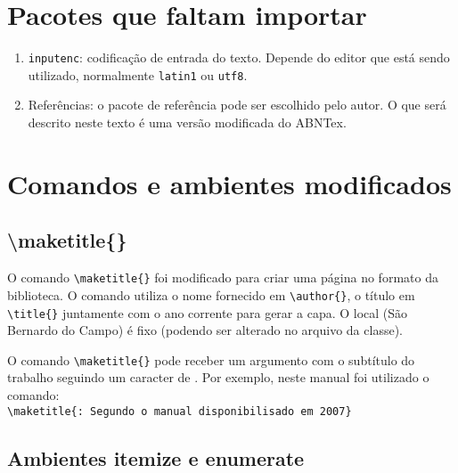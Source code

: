 \section{Pacotes que faltam importar}

    \begin{enumerate}
        \item\verb+inputenc+: codificação de entrada do texto. Depende do editor que está sendo utilizado, normalmente \texttt{latin1} ou \texttt{utf8}.
        \item Referências: o pacote de referência pode ser escolhido pelo autor. O que será descrito neste texto é uma versão modificada do ABNTex.
    \end{enumerate}

\section{Comandos e ambientes modificados}
    
    \subsection{\textbackslash maketitle\{\}}
    
    O comando \verb+\maketitle{}+ foi modificado para criar uma página no formato da biblioteca. O comando utiliza o nome fornecido em \verb+\author{}+, o título em \verb+\title{}+ juntamente com o ano corrente para gerar a capa. O local (São Bernardo do Campo) é fixo (podendo ser alterado no arquivo da classe).

    O comando \verb+\maketitle{}+ pode receber um argumento com o subtítulo do trabalho seguindo um caracter de \aspas{:}. Por exemplo, neste manual foi utilizado o comando: \\ \verb+\maketitle{: Segundo o manual disponibilisado em 2007}+

    \subsection{Ambientes itemize e enumerate}
    
